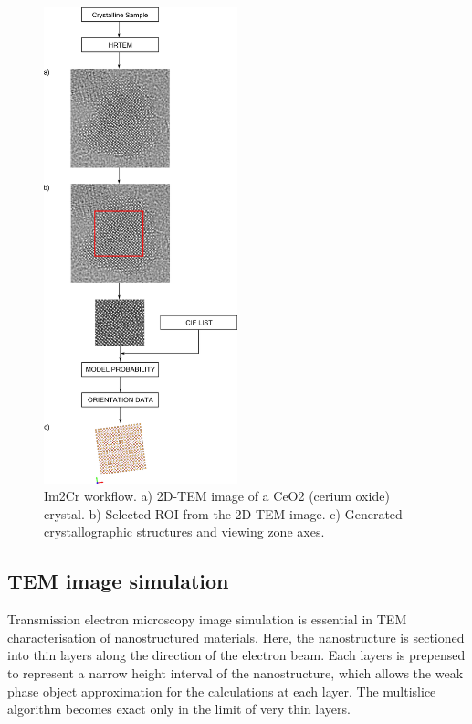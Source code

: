 \documentclass[
  oneside,
  11pt, a4paper,
  footinclude=true,
  headinclude=true,
  cleardoublepage=empty
]{scrbook}
\begin{document}
\begin{figure}[!ht]
	\begin{center}
	
	\includegraphics[width=0.5\textwidth]{img/Im2Cr_workflow.png}
			\caption[Im2Cr workflow]{Im2Cr workflow.\newline 
			a) 2D-TEM image of a CeO2 (cerium oxide) crystal.\newline
			b) Selected ROI from the 2D-TEM image.\newline
			c) Generated crystallographic structures and viewing zone axes.}
	\label{fig:im2cr_worflow}
		\end{center}
	\end{figure}
	
	\clearpage

	
		\subsection{TEM image simulation}
		
		Transmission electron microscopy image simulation is essential in TEM characterisation of nanostructured materials.
		Here, the nanostructure is sectioned into thin layers along the direction of the electron beam. Each layers is prepensed to represent a narrow height interval of the nanostructure, which allows the weak phase object approximation for the calculations at each layer. The multislice algorithm becomes exact only in the limit of very thin layers.\par 
		
\end{document}
